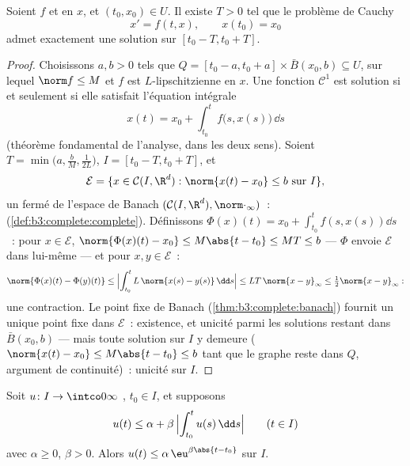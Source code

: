 \begin{theorem}
\label{thm:b3:ode:cauchylipschitz}
Soient $f$  et  en $x$, et
$(t_0, x_0) \in U$. Il existe $T > 0$ tel que le problème de
Cauchy
\[
x' = f(t, x), \qquad x(t_0) = x_0
\]
admet exactement une solution sur $[t_0 - T, t_0 +
T]$.
\end{theorem}

\begin{proof}
Choisissons $a, b > 0$ tels que $Q = [t_0 - a, t_0 + a]\times\bar
B(x_0, b) \subseteq U$, sur lequel $\norm f \leq M$ et $f$ est
$L$-lipschitzienne en $x$. Une fonction $\mathcal C^1$ est
solution si et seulement si elle satisfait l'équation
intégrale
\[
x(t) = x_0 + \int_{t_0}^{t}f\bigl(s, x(s)\bigr)\,\dd s
\]
(théorème fondamental de l'analyse, dans les deux sens). Soient
$T = \min\bigl(a, \frac bM, \frac1{2L}\bigr)$,
$I = [t_0 - T, t_0 + T]$, et
\[
\mathcal E = \{x \in \mathcal C(I, \R^d) : \norm{x(t) - x_0}
\leq b\ \text{sur } I\},
\]
un fermé de l'espace de Banach $(\mathcal C(I, \R^d),
\norm\cdot_\infty)$~: 
(\cref{def:b3:complete:complete}). Définissons
$\Phi(x)(t) = x_0 + \int_{t_0}^tf(s, x(s))\dd s$~: pour
$x \in \mathcal E$,
$\norm{\Phi(x)(t) - x_0} \leq M\abs{t - t_0} \leq MT \leq b$
--- $\Phi$ envoie $\mathcal E$ dans lui-même --- et pour
$x, y \in \mathcal E$~:
\[
\norm{\Phi(x)(t) - \Phi(y)(t)} \leq \Bigl|\int_{t_0}^t
L\,\norm{x(s) - y(s)}\,\dd s\Bigr| \leq LT\,\norm{x -
y}_\infty \leq \tfrac12\norm{x - y}_\infty :
\]
une contraction. Le point fixe de Banach
(\cref{thm:b3:complete:banach}) fournit un unique point fixe
dans $\mathcal E$~: existence, et unicité parmi les solutions
restant dans $\bar B(x_0, b)$ --- mais toute solution sur $I$
y demeure ($\norm{x(t) - x_0} \leq M\abs{t - t_0} \leq b$ tant
que le graphe reste dans $Q$, argument de continuité)~:
unicité sur $I$.
\end{proof}

\begin{lemma}[Gronwall]\label{lem:b3:ode:gronwall}
Soit $u \colon I \to \intco0\infty$ , $t_0 \in I$, et
supposons
\[
u(t) \leq \alpha + \beta\,\Bigl|\int_{t_0}^{t}u(s)\,\dd
s\Bigr| \qquad (t \in I)
\]
avec $\alpha \geq 0$, $\beta > 0$. Alors $u(t) \leq
\alpha\,\eu^{\beta\abs{t - t_0}}$ sur $I$.
\end{lemma}

